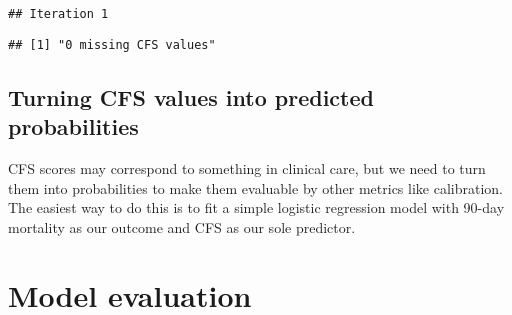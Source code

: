 \documentclass[
]{article}
\newenvironment{Shaded}{\begin{snugshade}}{\end{snugshade}}
\newcommand{\AttributeTok}[1]{\textcolor[rgb]{0.13,0.29,0.53}{#1}}
\newcommand{\FunctionTok}[1]{\textcolor[rgb]{0.13,0.29,0.53}{\textbf{#1}}}
\newcommand{\NormalTok}[1]{#1}
\newcommand{\OtherTok}[1]{\textcolor[rgb]{0.56,0.35,0.01}{#1}}
\newcommand{\SpecialCharTok}[1]{\textcolor[rgb]{0.81,0.36,0.00}{\textbf{#1}}}
\newcommand{\StringTok}[1]{\textcolor[rgb]{0.31,0.60,0.02}{#1}}
\begin{document}
\begin{verbatim}
## Iteration 1 
\end{verbatim}

\begin{Shaded}
\end{Shaded}

\begin{verbatim}
## [1] "0 missing CFS values"
\end{verbatim}

\hypertarget{turning-cfs-values-into-predicted-probabilities}{%
\subsection{Turning CFS values into predicted
probabilities}\label{turning-cfs-values-into-predicted-probabilities}}

CFS scores may correspond to something in clinical care, but we need to
turn them into probabilities to make them evaluable by other metrics
like calibration. The easiest way to do this is to fit a simple logistic
regression model with 90-day mortality as our outcome and CFS as our
sole predictor.

\begin{Shaded}
\end{Shaded}

\hypertarget{model-evaluation}{%
\section{Model evaluation}\label{model-evaluation}}
\end{document}
